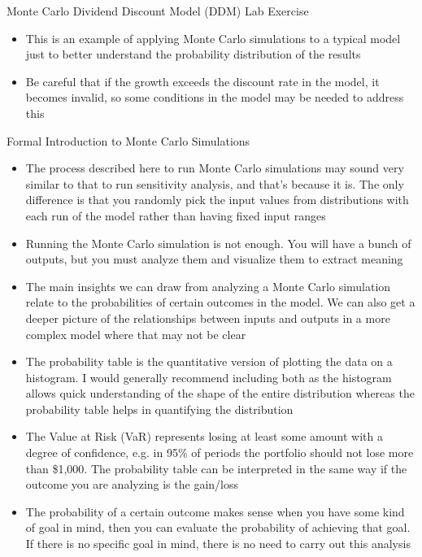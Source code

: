 \documentclass[]{article}
\begin{document}
\begin{section}{Monte Carlo Dividend Discount Model (DDM) Lab Exercise}
\begin{itemize}
\item This is an example of applying Monte Carlo simulations to a typical model just to better understand the probability distribution of the results
\item Be careful that if the growth exceeds the discount rate in the model, it becomes invalid, so some conditions in the model may be needed to address this
\end{itemize}
\end{section}
\begin{section}{Formal Introduction to Monte Carlo Simulations}
\begin{itemize}
\item The process described here to run Monte Carlo simulations may sound very similar to that to run sensitivity analysis, and that's because it is. The only difference is that you randomly pick the input values from distributions with each run of the model rather than having fixed input ranges
\item Running the Monte Carlo simulation is not enough. You will have a bunch of outputs, but you must analyze them and visualize them to extract meaning
\item The main insights we can draw from analyzing a Monte Carlo simulation relate to the probabilities of certain outcomes in the model. We can also get a deeper picture of the relationships between inputs and outputs in a more complex model where that may not be clear
\item The probability table is the quantitative version of plotting the data on a histogram. I would generally recommend including both as the histogram allows quick understanding of the shape of the entire distribution whereas the probability table helps in quantifying the distribution
\item The Value at Risk (VaR) represents losing at least some amount with a degree of confidence, e.g. in 95\% of periods the portfolio should not lose more than \$1,000. The probability table can be interpreted in the same way if the outcome you are analyzing is the gain/loss
\item The probability of a certain outcome makes sense when you have some kind of goal in mind, then you can evaluate the probability of achieving that goal. If there is no specific goal in mind, there is no need to carry out this analysis
\end{itemize}
\end{section}
\end{document}
